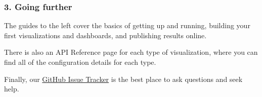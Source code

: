 \hypertarget{going-further}{%
\subsubsection{3. Going further}\label{going-further}}

The guides to the left cover the basics of getting up and running,
building your first visualizations and dashboards, and publishing
results online.

There is also an API Reference page for each type of visualization,
where you can find all of the configuration details for each type.

Finally, our
\href{https://github.com/simwrapper/simwrapper/issues}{GitHub Issue
Tracker} is the best place to ask questions and seek help.

